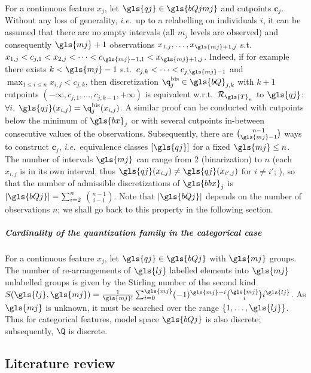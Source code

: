 For a continuous feature $x_j$, let $\gls{qj} \in \gls{bQjmj}$ and cutpoints $\boldsymbol{c}_j$. Without any loss of generality, \textit{i.e.}\ up to a relabelling on individuals $i$, it can be assumed that there are no empty intervals (all $m_j$ levels are observed) and consequently $\gls{mj}+1$ observations $x_{1,j},\dots,x_{\gls{mj}+1,j}$ s.t.\ $x_{1,j} < c_{j,1} < x_{2,j} < \dots < c_{\gls{mj}-1,1} < x_{\gls{mj}+1,j}$. Indeed, if for example there exists $k < \gls{mj} - 1$ s.t.\ $c_{j,k} < \dots < c_{j,\gls{mj}-1}$ and $\max_{1 \leq i \leq n} x_{i,j} < c_{j,k}$, then discretization $\q^{\text{bis}}_j \in \gls{bQ}_{j,k}$ with $k+1$ cutpoints $(-\infty,c_{j,1},\dots,c_{j,k-1},+\infty)$ is equivalent w.r.t.\ $\mathcal{R}_{\gls{T}_n}$ to $\gls{qj}$: $\forall i, \; \gls{qj}(x_{i,j}) = \q^{\text{bis}}_j(x_{i,j})$. A similar proof can be conducted with cutpoints below the minimum of $\gls{bx}_j$ or with several cutpoints in-between consecutive values of the observations. Subsequently, there are $\binom{n-1}{\gls{mj}-1}$ ways to construct $\bm{c}_j$, \textit{i.e.}\ equivalence classes $[\gls{qj}]$ for a fixed $\gls{mj} \leq n$. The number of intervals $\gls{mj}$ can range from $2$ (binarization) to $n$ (each $x_{i,j}$ is in its own interval, thus $\gls{qj}(x_{i,j}) \neq \gls{qj}(x_{i',j})$ for $i \neq i'$; ), so that the number of admissible discretizations of $\gls{bbx}_j$ is $|\gls{bQj}| = \sum_{i=2}^{n}$ ${n-1}\choose{i-1}$. Note that $|\gls{bQj}|$ depends on the number of observations $n$; we shall go back to this property in the following section.


\subparagraph{Cardinality of the quantization family in the categorical case}

For a continuous feature $x_j$, let $\gls{qj} \in \gls{bQj}$ with $\gls{mj}$ groups. The number of re-arrangements of $\gls{lj}$ labelled elements into $\gls{mj}$ unlabelled groups is given by the Stirling number of the second kind $S(\gls{lj},\gls{mj}) = \frac{1}{\gls{mj}!} \sum_{i=0}^{\gls{mj}} (-1)^{\gls{mj}-i} {\gls{mj} \choose i} i^{\gls{lj}}$. As $\gls{mj}$ is unknown, it must be searched over the range $\{1,\dots,\gls{lj}\}$. Thus for categorical features, model space $\gls{bQj}$ is also discrete; subsequently, $\Q$ is discrete.







\subsection{Literature review}

